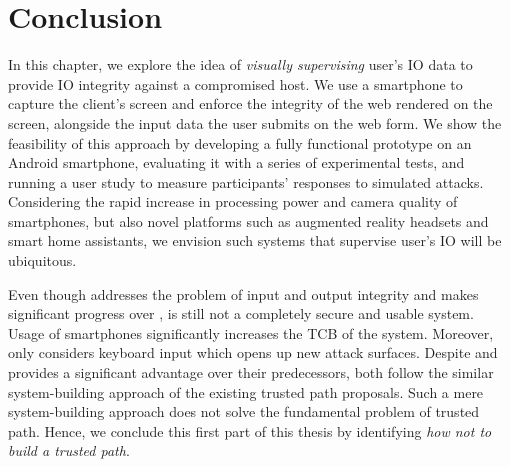 \section{Conclusion} 
\label{integriscreen:sec:conclusion}

In this chapter, we explore the idea of \emph{visually supervising} user's IO data to provide IO integrity against a compromised host. We use a smartphone to capture the client's screen and enforce the integrity of the web rendered on the screen, alongside the input data the user submits on the web form. We show the feasibility of this approach by developing a fully functional prototype on an Android smartphone, evaluating it with a series of experimental tests, and running a user study to measure participants' responses to simulated attacks.
Considering the rapid increase in processing power and camera quality of smartphones, but also novel platforms such as augmented reality headsets and smart home assistants, we envision such systems that supervise user's IO will be ubiquitous.

Even though \integriscreen addresses the problem of input and output integrity and makes significant progress over \integriscreen, \integriscreen is still not a completely secure and usable system. Usage of smartphones significantly increases the TCB of the system. Moreover, \integriscreen only considers keyboard input which opens up new attack surfaces. Despite \integrikey and \integriscreen provides a significant advantage over their predecessors, both follow the similar system-building approach of the existing trusted path proposals. Such a mere system-building approach does not solve the fundamental problem of trusted path. Hence, we conclude this first part of this thesis by identifying \emph{how not to build a trusted path}. 